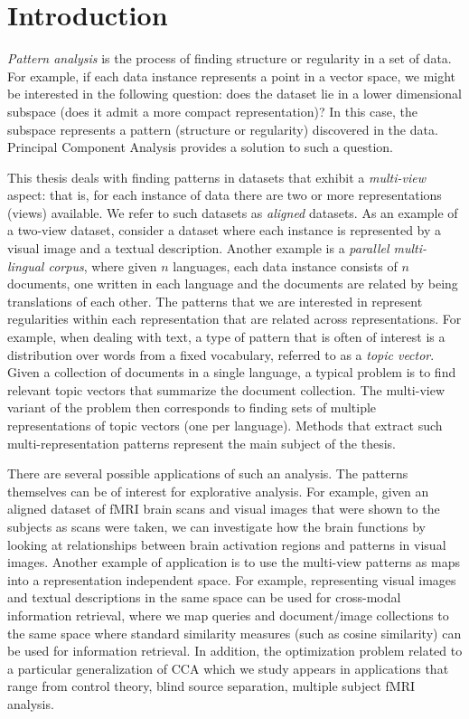 %
\chapter{Introduction}


\emph{Pattern analysis} is the process of finding structure or regularity in a set of data. For example,
if each data instance represents a point in a vector space, we might be interested in the following question: does the dataset lie
in a lower dimensional subspace (does it admit a more compact representation)? In this case, the subspace represents a pattern (structure or regularity)
discovered in the data. Principal Component Analysis provides a solution to such a question.

 This thesis deals with finding patterns in datasets that exhibit a \emph{multi-view} aspect: that is, for
each instance of data there are two or more representations (views) available. We refer to such datasets as
\emph{aligned} datasets. As an example of a two-view dataset, consider a dataset where each instance is represented by a visual image and
a textual description. Another example is a \emph{parallel multi-lingual corpus},
where given $n$ languages, each data instance consists of $n$ documents, one written in each language and the documents are related by being
translations of each other. The patterns that we are interested in represent regularities within each representation
 that are related across representations. For example, when dealing with text, a type of pattern that is often of interest
 is a distribution over words from a fixed vocabulary, referred to as a \emph{topic vector}. Given a collection of documents
 in a single language, a typical problem is to find relevant topic vectors that summarize the document collection. The multi-view
 variant of the problem then corresponds to finding sets of multiple representations of topic vectors (one per language).
Methods that extract such multi-representation patterns represent the main subject of the thesis.

There are several possible applications of such an analysis. The patterns themselves can be of interest
for explorative analysis. For example, given an aligned dataset of fMRI brain scans and visual images that were
shown to the subjects as scans were taken, we can investigate how the brain functions by looking at
relationships between brain activation regions and patterns in visual images.
 Another example of application is to use the multi-view patterns as maps into a
representation independent space. For example, representing visual images and textual descriptions in the same
space can be used for cross-modal information retrieval, where we map queries and document/image collections
to the same space where standard similarity measures (such as cosine similarity) can be used for information
retrieval. In addition, the optimization problem related to a particular generalization of CCA which we study
appears in applications that range from control theory, blind source separation, multiple subject fMRI analysis.

